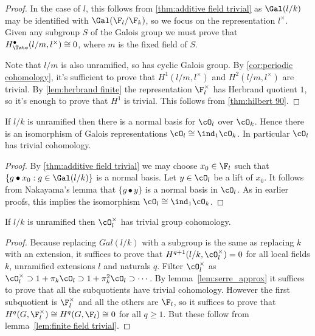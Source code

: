 \begin{proof}
	In the case of $l$, this follows from \ref{thm:additive field trivial} as $\Gal(l/k)$ may be
	identified with $\Gal(\F_l / \F_k)$, so we focus on the
	representation $l^\times$. Given any subgroup $S$ of the Galois group we must prove that
	$H^\bullet_{\Tate}(l/m,l^\times) \cong 0$, where $m$ is the fixed field of $S$.

	Note that $l/m$ is also unramified, so has cyclic Galois group.
	By \ref{cor:periodic cohomology},
	it's sufficient to prove that $H^1(l/m,l^\times)$ and $H^2(l/m,l^\times)$ are trivial.
	By \ref{lem:herbrand finite} the representation $\F_l^\times$ has Herbrand quotient $1$,
	so it's enough to prove that $H^1$ is trivial.
	This follows from \ref{thm:hilbert 90}.
\end{proof}


\begin{lemma} \label{lem:unramified additive trivial}
	If $l/k$ is unramified then there is a normal basis for $\cO_l$ over $\cO_k$.
	Hence there is an isomorphism of Galois representations $\cO_l \cong \ind_1 \cO_k$.
	In particular $\cO_l$ has trivial cohomology.
\end{lemma}

\begin{proof}
	By \ref{thm:additive field trivial}
	we may choose $x_0 \in \F_l$
	such that $\{g \bullet x_0 :g \in \Gal(l/k)\}$ is a normal basis.
	Let $y \in \cO_l$ be a lift of $x_0$.
	It follows from Nakayama's lemma that $\{g \bullet y\}$ is a normal basis	in $\cO_l$.
	As in earlier proofs, this implies the isomorphism $\cO_l \cong \ind_1 \cO_k$.
\end{proof}




\begin{lemma}	\label{lem:unramified units trivial}
	If $l/k$ is unramified then $\cO_l^\times$ has trivial group cohomology.
\end{lemma}

\begin{proof}
	Because replacing $Gal(l/k)$ with a subgroup is the same as replacing $k$ with an extension,
	it suffices to prove that $H^{q+1}(l/k,\cO_l^\times)=0$ for all local fields $k$,
	unramified extensions $l$ and naturals $q$. Filter $\cO_l^\times$ as
	$\cO_l^\times\supset 1+\pi_k\cO_l\supset 1+\pi_k^2\cO_l\supset\cdots$.
	By lemma~\ref{lem:serre_approx} it suffices to prove that all the subquotients have
	trivial cohomology. However the first subquotient is $\F_l^\times$ and all the others
	are $\F_l$, so it suffices to prove that $H^q(G,\F_l^\times)\cong H^q(G,\F_l)\cong 0$
	for all $q\geq1$.
	But these follow from lemma~\ref{lem:finite field trivial}.
\end{proof}


